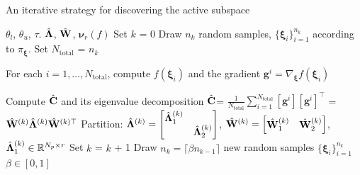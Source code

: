 \bigskip
\begin{breakablealgorithm}
\renewcommand{\algorithmicrequire}{\textbf{Input:}}
\renewcommand{\algorithmicensure}{\textbf{Output:}}
  \caption{An iterative strategy for discovering the active subspace}
  \begin{algorithmic}[1]
\Require $\theta_l$, $\theta_u$, $\tau$. 
\Ensure $\hat{\mathbf{{\Lambda}}}$, $\hat{\mathbf{{W}}}$, $\bm{\nu}_r(f)$ %
    \State Set $k$ = 0
	\State Draw $n_k$ random samples, $\{\bm{\xi}_i\}_{i=1}^{n_k}$ 
         according to $\pi_{\bm{\xi}}$. 
    \State Set $N_\text{total}$ = $n_k$ 

	\State For each $i=1, \ldots, N_\text{total}$, compute $f(\bm{\xi}_i)$ and the gradient $\bm{g}^i = \nabla_{\bm{\xi}}f(\bm{\xi}_i)$

	\State Compute $\hat{\mathbf{{C}}}$ and its eigenvalue decomposition 
		$\hat{\mathbf{{C}}}$= $\frac{1}{N_\text{total}}\sum\limits_{i=1}^{N_\text{total}}[\bm{g}^i][\bm{g}^i]^\top$ = 
		$\hat{\mathbf{{W}}}^{(k)}\hat{\mathbf{{\Lambda}}}^{(k)} \hat{\mathbf{{W}}}^{(k)\top}$
	\State Partition: $\hat{\mathbf{{\Lambda}}}^{(k)}=
        \begin{bmatrix} \hat{\mathbf{{\Lambda}}}_1^{(k)} & \\ & \hat{\mathbf{{\Lambda}}}_2^{(k)} \end{bmatrix}$, 
        $\hat{\mathbf{{W}}}^{(k)}=\begin{bmatrix} \hat{\mathbf{{W}}}_1^{(k)} & \hat{\mathbf{{W}}}_2^{(k)} \end{bmatrix}$, 
        $\hat{\mathbf{{\Lambda}}}_1^{(k)}\in \mathbb{R}^{N_p\times r}$
	\Loop
		\State Set $k$ = $k$ + 1
		\State Draw $n_k =  \lceil\beta n_{k-1}\rceil$  new random samples 
                $\{\bm{\xi}_i\}_{i=1}^{n_k}$  $\beta\in[0,1]$
                

\end{algorithmic}
\end{breakablealgorithm}
